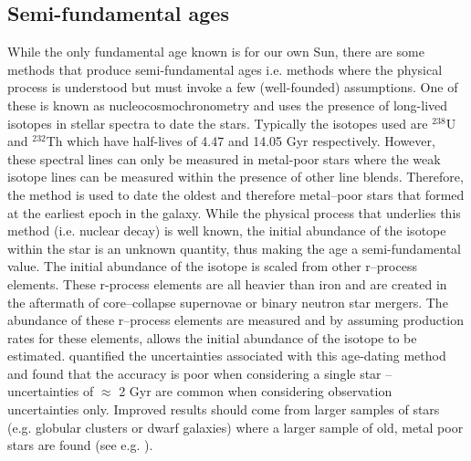 \subsection{Semi-fundamental ages}
While the only fundamental age known is for our own Sun, there are some methods that produce semi-fundamental ages i.e. methods where the physical process is understood but must invoke a few (well-founded) assumptions. One of these is known as nucleocosmochronometry and uses the presence of long-lived isotopes in stellar spectra to date the stars. Typically the isotopes used are $^{238}$U and $^{232}$Th which have half-lives of 4.47 and 14.05 Gyr respectively. However, these spectral lines can only be measured in metal-poor stars where the weak isotope lines can be measured within the presence of other line blends. Therefore, the method is used to date the oldest and therefore metal--poor stars that formed at the earliest epoch in the galaxy. While the physical process that underlies this method (i.e. nuclear decay) is well known, the initial abundance of the isotope within the star is an unknown quantity, thus making the age a semi-fundamental value. The initial abundance of the isotope is scaled from other r--process elements. These r-process elements are all heavier than iron and are created in the aftermath of core--collapse supernovae or binary neutron star mergers. The abundance of these r--process elements are measured and by assuming production rates for these elements, allows the initial abundance of the isotope to be estimated. \citet{Ludwig_etal_2010} quantified the uncertainties associated with this age-dating method and found that the accuracy is poor when considering a single star -- uncertainties of $\approx$ 2 Gyr are common when considering observation uncertainties only. Improved results should come from larger samples of stars (e.g. globular clusters or dwarf galaxies) where a larger sample of old, metal poor stars are found (see e.g. \citealt{Hansen_etal_2018}). 

